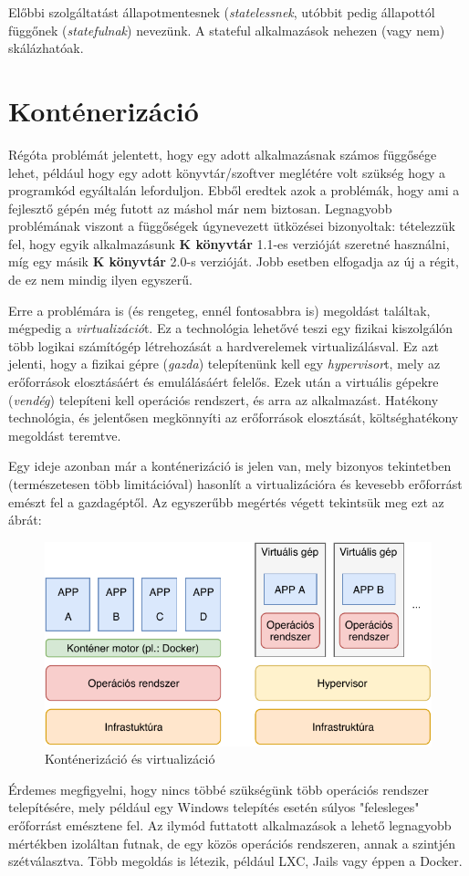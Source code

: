 Előbbi szolgáltatást állapotmentesnek (\textit{statelessnek}, utóbbit pedig állapottól függőnek (\textit{statefulnak}) nevezünk. A stateful alkalmazások nehezen (vagy nem) skálázhatóak.
\section{Konténerizáció}
Régóta problémát jelentett, hogy egy adott alkalmazásnak számos függősége lehet, például hogy egy adott könyvtár/szoftver meglétére volt szükség hogy a programkód egyáltalán leforduljon. Ebből eredtek azok a problémák, hogy ami a fejlesztő gépén még futott az máshol már nem biztosan. Legnagyobb problémának viszont a függőségek úgynevezett ütközései bizonyoltak: tételezzük fel, hogy egyik alkalmazásunk \textbf{K könyvtár} 1.1-es verzióját szeretné használni, míg egy másik \textbf{K könyvtár} 2.0-s verzióját. Jobb esetben elfogadja az új a régit, de ez nem mindig ilyen egyszerű.

Erre a problémára is (és rengeteg, ennél fontosabbra is) megoldást találtak, mégpedig a \textit{virtualizáció}t. Ez a technológia lehetővé teszi egy fizikai kiszolgálón több logikai számítógép létrehozását a hardverelemek virtualizálásval. Ez azt jelenti, hogy a fizikai gépre (\textit{gazda}) telepítenünk kell egy \textit{hypervisor}t, mely az erőforrások elosztásáért és emulálásáért felelős. Ezek után a virtuális gépekre (\textit{vendég}) telepíteni kell operációs rendszert, és arra az alkalmazást. Hatékony technológia, és jelentősen megkönnyíti az erőforrások elosztását, költséghatékony megoldást teremtve.

Egy ideje azonban már a konténerizáció is jelen van, mely bizonyos tekintetben (természetesen több limitációval) hasonlít a virtualizációra és kevesebb erőforrást emészt fel a gazdagéptől. Az egyszerűbb megértés végett tekintsük meg ezt az ábrát:
\begin{figure}[ht]
\centering
\includegraphics[width=125mm, keepaspectratio]{img/virtcont.pdf}
\caption{Konténerizáció és virtualizáció}
\end{figure}
\vskip 0.1in
Érdemes megfigyelni, hogy nincs többé szükségünk több operációs rendszer telepítésére, mely például egy Windows telepítés esetén súlyos "felesleges" erőforrást emésztene fel. Az ilymód futtatott alkalmazások a lehető legnagyobb mértékben izoláltan futnak, de egy közös operációs rendszeren, annak a szintjén szétválasztva. Több megoldás is létezik, például LXC, Jails vagy éppen a Docker.
